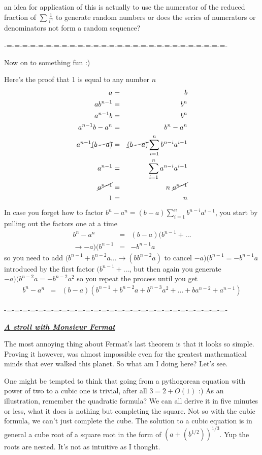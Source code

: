 \documentclass[aps,preprint,preprintnumbers,nofootinbib,showpacs,prd]{revtex4-1}
\newcommand{\nbea}{\begin{eqnarray*}}
\newcommand{\neea}{\end{eqnarray*}}
\begin{document}
an idea for application of this is actually to use the numerator of the reduced fraction of $\sum \frac{1}{i^n}$ to generate random numbers or does the series of numerators or denominators not form a random sequence?

-=-=-=-=-=-=-=-=-=-=-=-=-=-=-=-=-=-=-=-=-=-=-=-=-=-=-=-=-

Now on to something fun :)

Here's the proof that 1 is equal to any number $n$
%
\nbea
a & = & b \\
a b^{n-1} & = & b^{n}\\
a^{n-1} b & = & b^{n}\\
a^{n-1} b - a^{n} & = & b^{n} - a^{n}\\
a^{n-1} \cancel{(b - a)} & = & \cancel{(b - a)} \sum_{i=1}^{n} b^{n-i} a^{i-1} \\
a^{n-1} & = & \sum_{i=1}^{ n} a^{n-i} a^{i-1} \\
\cancel{a^{n-1}} & = &  n ~ \cancel{a^{n-1}} \\
1 & = & n
\neea
%
In case you forget how to factor $b^{n} - a^{n} = (b - a) \sum_{i=1}^{n} b^{n-i} a^{i-1}$, you start by pulling out the factors one at a time
%
\nbea
b^{n}  -  a^{n} & = & (b  -  a) (b^{n-1} + \dots \\
\rightarrow - a) (b^{n-1} & = & - b^{n-1} a
\neea
%
so you need to add $(b^{n-1} + b^{n-2} a \dots \rightarrow (b  b^{n-2} a)$ to cancel $-  a) (b^{n-1} = - b^{n-1} a$ introduced by the first factor $(b^{n-1} + \dots$, but then again you generate $- a) (b^{n-2} a = -b^{n-2} a^2$ so you repeat the process until you get
%
\nbea
b^{n}  -  a^{n} & = & (b  -  a) (b^{n-1} + b^{n-2} a + b^{n-3} a^2 + \dots + b a^{n-2} + a^{n-1})
\neea
%

-=-=-=-=-=-=-=-=-=-=-=-=-=-=-=-=-=-=-=-=-=-=-=-=-=-=-=-=-

\bigskip\underline{\textit{\textbf{A stroll with Monsieur Fermat}}}

The most annoying thing about Fermat's last theorem is that it looks so simple. Proving it however, was almost impossible even for the greatest mathematical minds that ever walked this planet. So what am I doing here? Let's see.

One might be tempted to think that going from a pythogorean equation with power of two to a cubic one is trivial, after all $3 = 2 + O(1)$ :) As an illustration, remember the quadratic formula? We can all derive it in five minutes or less, what it does is nothing but completing the square. Not so with the cubic formula, we can't just complete the cube. The solution to a cubic equation is in general a cube root of a square root in the form of $(a + (b^{1/2}))^{1/3}$. Yup the roots are nested. It's not as intuitive as I thought.
\end{document}
